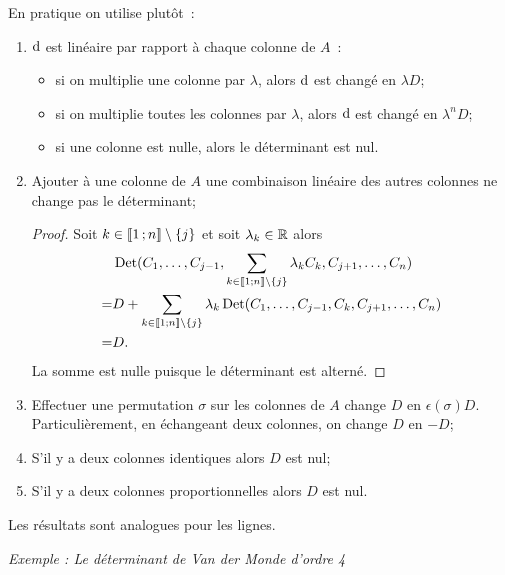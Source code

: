 En pratique on utilise plutôt~:
\begin{enumerate}
  \item \(\mathrm{d}\) est linéaire par rapport à chaque colonne de \(A\)~:
    \begin{itemize}
      \item si on multiplie une colonne par \(\lambda\), alors \(\mathrm{d}\) est 
        changé en \(\lambda D\);
      \item si on multiplie toutes les colonnes par \(\lambda\), alors 
        \(\mathrm{d}\) est changé en \(\lambda^n D\);
      \item si une colonne est nulle, alors le déterminant est nul.
    \end{itemize}
  \item Ajouter à une colonne de \(A\) une combinaison linéaire des autres 
    colonnes ne change pas le déterminant;

    \begin{proof}
      Soit \(k \in \mathopen{\llbracket}1\mathclose{}\mathpunct{};n\mathclose{\rrbracket}\setminus\{j\}\) et soit 
      \(\lambda_k \in \mathbb{R}\) alors
      \begin{align}
        &\operatorname{Det}(C_1, \ldots, C_{j-1}, \sum_{k \in 
        \mathopen{\llbracket}1\mathclose{}\mathpunct{};n\mathclose{\rrbracket}\setminus\{j\}}\lambda_kC_k, C_{j+1}, 
        \ldots, C_n) \\
        =&D + \sum_{k \in \mathopen{\llbracket}1\mathclose{}\mathpunct{};n\mathclose{\rrbracket}\setminus\{j\}}\lambda_k 
        \operatorname{Det}(C_1, \ldots, C_{j-1}, C_k, C_{j+1}, \ldots, C_n) \\
        =&D.
      \end{align}
      La somme est nulle puisque le déterminant est alterné.
    \end{proof}
  \item Effectuer une permutation \(\sigma\) sur les colonnes de \(A\) 
    change \(D\) en \(\epsilon(\sigma)D\). Particulièrement, en échangeant 
    deux colonnes, on change \(D\) en \(-D\);
  \item S'il y a deux colonnes identiques alors \(D\) est nul;
  \item S'il y a deux colonnes proportionnelles alors \(D\) est nul.
\end{enumerate}
Les résultats sont analogues pour les lignes.

\emph{Exemple : Le déterminant de Van der Monde d'ordre 4}

